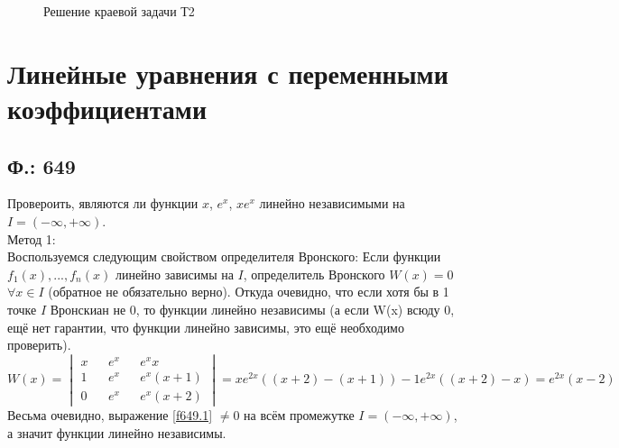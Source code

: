 \documentclass{article}
\begin{document}
\begin{figure}[h]
\caption{Решение краевой задачи Т2}
\label{fig:T2}
\end{figure}
\section{Линейные уравнения с переменными коэффициентами}
\subsection{Ф.: 649}
Провероить, являются ли функции $x$, $e^x$, $x e^x$ линейно независимыми на $I=(-\infty,+\infty)$.\\

Метод 1:\\ 
Воспользуемся следующим свойством определителя Вронского: Если функции $f_1(x),...,f_n(x)$ линейно зависимы на $I$, определитель Вронского $W(x)=0$ $\forall x \in I$ (обратное не обязательно верно). Откуда очевидно, что если хотя бы в 1 точке $I$ Вронскиан не 0, то функции линейно независимы (а если W(x) всюду 0, ещё нет гарантии, что функции линейно зависимы, это ещё необходимо проверить).\\
\begin{equation}\label{f649.1}
    W(x) = 
    \begin{vmatrix}
    x && e^x && e^x x \\
    1 && e^x && e^x(x+1)\\
    0 && e^x && e^x(x+2)
    \end{vmatrix}
    =x e^{2x} ((x+2)-(x+1))-1 e^{2x}((x+2)-x) = e^{2x}(x-2)
\end{equation}
Весьма очевидно, выражение \ref{f649.1} $\neq 0$ на всём промежутке $I=(-\infty,+\infty)$, а значит функции линейно независимы.\\
\end{document}
